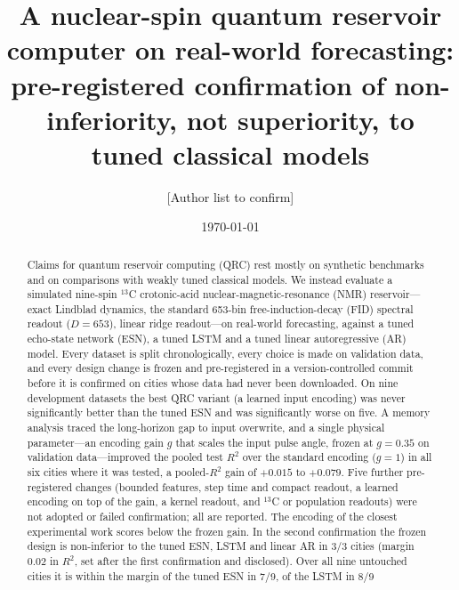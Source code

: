 \documentclass[aps,prresearch,preprint,superscriptaddress,amsmath,amssymb,floatfix]{revtex4-2}
\begin{document}
\title{A nuclear-spin quantum reservoir computer on real-world forecasting:
pre-registered confirmation of non-inferiority, not superiority, to tuned classical models}

\author{[Author list to confirm]}

\date{\today}

\begin{abstract}
Claims for quantum reservoir computing (QRC) rest mostly on synthetic benchmarks and
on comparisons with weakly tuned classical models. We instead evaluate a simulated
nine-spin $^{13}$C crotonic-acid nuclear-magnetic-resonance (NMR) reservoir---exact
Lindblad dynamics, the standard 653-bin free-induction-decay (FID) spectral readout
($D=653$), linear ridge readout---on real-world forecasting, against a tuned echo-state
network (ESN), a tuned LSTM and a tuned linear autoregressive (AR) model. Every
dataset is split chronologically, every choice is made on validation data, and
every design change is frozen and pre-registered in a version-controlled commit
before it is confirmed on cities whose data had never been downloaded. On nine
development datasets the best QRC variant (a learned input encoding) was never
significantly better than the tuned ESN and was significantly worse on five. A memory analysis traced the long-horizon gap to
input overwrite, and a single physical parameter---an encoding gain $g$ that scales the
input pulse angle, frozen at $g=0.35$ on validation data---improved the pooled test
$R^2$ over the standard encoding ($g=1$) in all six cities where it was tested, a
pooled-$R^2$ gain of $+0.015$ to $+0.079$. Five further pre-registered changes (bounded features, step time
and compact readout, a learned encoding on top of the gain, a kernel readout, and
$^{13}$C or population readouts) were not adopted or failed confirmation; all are
reported. The encoding of the closest experimental work scores below the frozen gain. In the second confirmation the frozen
design is non-inferior to the tuned ESN, LSTM and linear AR in 3/3 cities (margin
$0.02$ in $R^2$, set after the first confirmation and disclosed). Over all nine
untouched cities it is within the margin of the tuned ESN in 7/9, of the LSTM in 8/9

\end{abstract}
\end{document}
